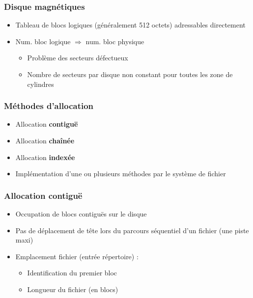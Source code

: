 \begin{frame}
\frametitle{ Disque magnétiques}
\begin{itemize}
\item Tableau de blocs logiques (généralement 512 octets) adressables directement
\item Num. bloc logique $\Longrightarrow$ num. bloc physique
\begin{itemize}
\item Problème des secteurs défectueux
\item Nombre de secteurs par disque non constant pour toutes les zone de cylindres
\end{itemize}
\end{itemize}
\end{frame}

\begin{frame}
\frametitle{Méthodes d'allocation}
\begin{itemize}
\item Allocation \textbf{contiguë}
\item Allocation \textbf{chaînée}
\item Allocation \textbf{indexée}

\item Implémentation d'une ou plusieurs méthodes par le système de fichier
\end{itemize}
\end{frame}

\begin{frame}
\frametitle{Allocation contiguë}
\begin{itemize}
\item Occupation de blocs contiguës sur le disque
\item Pas de déplacement de tête lors du parcours séquentiel d'un fichier (une piste maxi)
\item Emplacement fichier (entrée répertoire) :
\begin{itemize}
\item Identification du premier bloc
\item Longueur du fichier (en blocs)
\end{itemize}
\end{itemize}
\end{frame}

